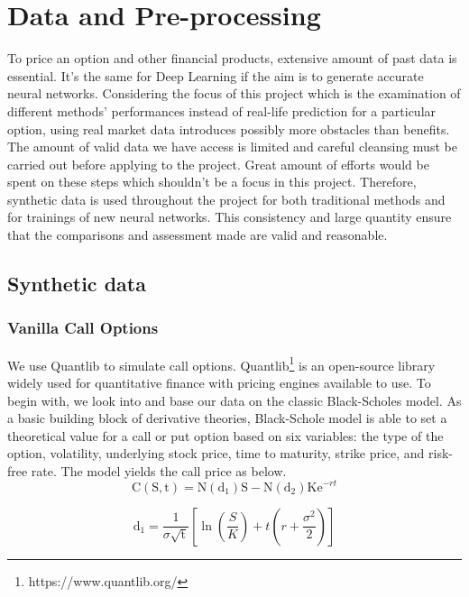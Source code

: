\documentclass{report}
\begin{document}
\chapter{Data and Pre-processing}
To price an option and other financial products, extensive amount of past data is essential. It's the same for Deep Learning if the aim is to generate accurate neural networks. Considering the focus of this project which is the examination of different methods' performances instead of real-life prediction for a particular option, using real market data introduces possibly more obstacles than benefits. The amount of valid data we have access is limited and careful cleansing must be carried out before applying to the project. Great amount of efforts would be spent on these steps which shouldn't be a focus in this project. Therefore, synthetic data is used throughout the project for both traditional methods and for trainings of new neural networks. This consistency and large quantity ensure that the comparisons and assessment made are valid and reasonable.

\section{Synthetic data}

\subsection{Vanilla Call Options}
We use Quantlib to simulate call options. Quantlib\footnote{https://www.quantlib.org/} is an open-source library widely used for quantitative finance with pricing engines available to use. To begin with, we look into and base our data on the classic Black-Scholes model. As a basic building block of derivative theories, Black-Schole model is able to set a theoretical value for a call or put option based on six variables: the type of the option, volatility, underlying stock price, time to maturity, strike price, and risk-free rate. The model yields the call price as below.\\

\begin{equation}
\mathrm C(\mathrm S,\mathrm t)= \mathrm N(\mathrm d_1)\mathrm S - \mathrm N(\mathrm d_2) \mathrm K \mathrm e^{-rt}
\label{eq:2}
\end{equation}

\begin{equation}
\mathrm d_1= \frac{1}{\sigma \sqrt{\mathrm t}} \left[\ln{\left(\frac{S}{K}\right)} + t\left(r + \frac{\sigma^2}{2} \right) \right]
\end{equation}
\end{document}
